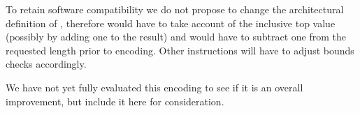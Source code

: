 To retain software compatibility we do not propose to change the architectural definition of \ctop{}, therefore  would have to take account of the inclusive top value (possibly by adding one to the result) and  would have to subtract one from the requested length prior to encoding.
Other instructions will have to adjust bounds checks accordingly.

We have not yet fully evaluated this encoding to see if it is an overall improvement, but include it here for consideration.